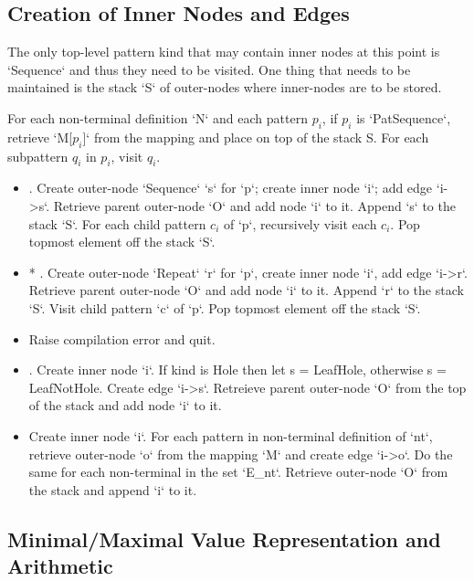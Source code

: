 \subsection{Creation of Inner Nodes and Edges}

The only top-level pattern kind that may contain inner nodes at this point is `Sequence` and thus they need to be visited. One thing that needs to be maintained is the stack `S` of outer-nodes where inner-nodes are to be stored.

For each non-terminal definition `N` and each pattern $p_i$, if $p_i$ is `PatSequence`, retrieve `M[$p_i$]` from the mapping and place on top of the stack S. For each subpattern $q_i$ in $p_i$, visit $q_i$.

\begin{itemize}
\item
\PatternSequence. Create outer-node `Sequence` `s` for `p`; create inner node `i`; add edge `i->s`. Retrieve parent outer-node `O` and add node `i` to it. Append `s` to the stack `S`. For each child pattern $c_i$ of `p`, recursively visit each $c_i$. Pop topmost element off the stack `S`.

\item
* \Repeat. Create outer-node `Repeat` `r` for `p`, create inner node `i`, add edge `i->r`. Retrieve parent outer-node `O` and add node `i` to it. Append `r` to the stack `S`. Visit child pattern `c` of `p`. Pop topmost element off the stack `S`. 

\item
\InHolePattern Raise compilation error and quit.

\item
\BuiltInPattern. Create inner node `i`. If kind is Hole then let s = LeafHole, otherwise s = LeafNotHole. Create edge `i->s`.  Retreieve parent outer-node `O` from the top of the stack and add node `i` to it.

\item
\Nt Create inner node `i`. For each pattern in non-terminal definition of `nt`, retrieve outer-node `o` from the mapping `M` and create edge `i->o`. Do the same for each non-terminal in the set `E\_nt`. Retrieve outer-node `O` from the stack and append `i` to it.

\end{itemize}

\subsection{Minimal/Maximal Value Representation and Arithmetic}

